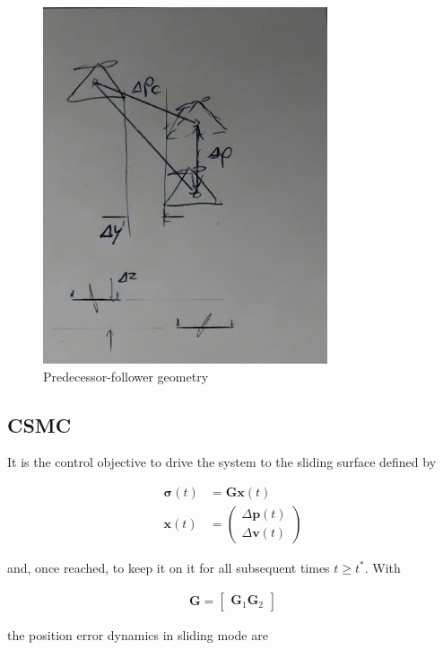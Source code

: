 \documentclass{ifacconf}
\providecommand{\mbf}[1]{\mathbf{#1}}
\begin{document}
\begin{figure}
\begin{center}
\includegraphics[width=8.4cm]{geometry}    %
\caption{Predecessor-follower geometry}
\label{fig:geometry}
\end{center}
\end{figure}

\subsection{CSMC}

It is the control objective to drive the system to the sliding surface defined by

\begin{align}
\mbf{\sigma}(t) &= \mbf{G}\mbf{x}(t)
\label{eq:defsigmaconti-} \\
\mbf{x}(t) &=
\begin{pmatrix}
\Delta \mbf{p}(t)\\
\Delta \mbf{v}(t)
\end{pmatrix}
\end{align}

and, once reached, to keep it on it for all subsequent times $t \geq t^*$. With

\begin{align}
\mbf{G} =
\begin{bmatrix}
\mbf{G}_1 \mbf{G}_2
\end{bmatrix}
\end{align}

the position error dynamics in sliding mode are
\end{document}
